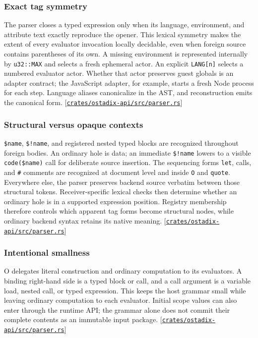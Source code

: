 \documentclass[11pt,oneside]{article}
\newcommand{\src}[1]{\textcolor{OSlate}{\scriptsize[\href{https://github.com/lostadi/OSTADIX/blob/c0b02c326b2329a95ba52447c7180bc93957cd57/#1}{\nolinkurl{#1}}]}\allowbreak}
\begin{document}
\subsubsection{Exact tag symmetry}

The parser closes a typed expression only when its language, environment, and
attribute text exactly reproduce the opener. This lexical symmetry makes the
extent of every evaluator invocation locally decidable, even when foreign
source contains parentheses of its own. A missing environment is represented
internally by \texttt{u32::MAX} and selects a fresh ephemeral actor. An
explicit \texttt{LANG[n]} selects a numbered evaluator actor. Whether that
actor preserves guest globals is an adapter contract; the JavaScript adapter,
for example, starts a fresh Node process for each step. Language
aliases canonicalize in the AST, and reconstruction emits the canonical form.
\src{crates/ostadix-api/src/parser.rs}

\subsubsection{Structural versus opaque contexts}

\texttt{\$name}, \texttt{\$!name}, and registered nested typed blocks
are recognized throughout foreign bodies. An ordinary hole is data; an
immediate \texttt{\$!name} lowers to a visible \texttt{code(\$name)}
call for deliberate source insertion. The sequencing forms \texttt{let}, calls, and \texttt{\#}
comments are recognized at document level and inside \texttt{O} and
\texttt{quote}. Everywhere else, the parser preserves backend source
verbatim between those structural tokens. Receiver-specific lexical checks
then determine whether an ordinary hole is in a supported expression position.
Registry membership therefore controls which apparent tag forms
become structural nodes, while ordinary backend syntax retains its native
meaning. \src{crates/ostadix-api/src/parser.rs}

\subsubsection{Intentional smallness}

O delegates literal construction and ordinary computation to its evaluators.
A binding right-hand side is a typed block or call, and a call argument is a
variable load, nested call, or typed expression. This keeps the host grammar
small while leaving ordinary computation to each evaluator. Initial scope
values can also enter through the runtime API; the grammar alone does not
commit their complete contents as an immutable input package.
\src{crates/ostadix-api/src/parser.rs}
\end{document}
